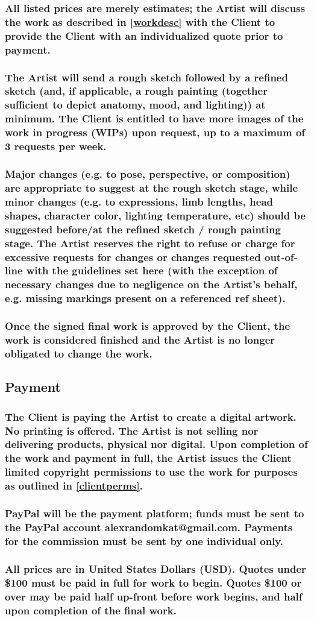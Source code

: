 \documentclass{article}
\newcommand{\subs}[2][]{\subsubsection[#1]{\normalfont #2}}
\begin{document}
\begin{flushleft}
		\subs[Estimations and Quotes]{All listed prices are merely estimates; the Artist will discuss the work as described in \ref{workdesc} with the Client to provide the Client with an individualized quote prior to payment.}

		\subs[WIPs]{The Artist will send a rough sketch followed by a refined sketch (and, if applicable, a rough painting (together sufficient to depict anatomy, mood, and lighting)) at minimum. The Client is entitled to have more images of the work in progress (WIPs) upon request, up to a maximum of 3 requests per week.}

		\subs[Changes and Feedback]{Major changes (e.g. to pose, perspective, or composition) are appropriate to suggest at the rough sketch stage, while minor changes (e.g. to expressions, limb lengths, head shapes, character color, lighting temperature, etc) should be suggested before/at the refined sketch / rough painting stage. The Artist reserves the right to refuse or charge for excessive requests for changes or changes requested out-of-line with the guidelines set here (with the exception of necessary changes due to negligence on the Artist's behalf, e.g. missing markings present on a referenced ref sheet).}

		\subs[Concluding Work]{Once the signed final work is approved by the Client, the work is considered finished and the Artist is no longer obligated to change the work.}

	\leftskip=1cm
	\subsection{Payment} 
	\leftskip=2cm
		\subs[Payment for a Service]{The Client is paying the Artist to create a digital artwork. No printing is offered. The Artist is not selling nor delivering products, physical nor digital. Upon completion of the work and payment in full, the Artist issues the Client limited copyright permissions to use the work for purposes as outlined in \ref{clientperms}.}

		\subs[Acceptable Payment Methods]{PayPal will be the payment platform; funds must be sent to the PayPal account alexrandomkat@gmail.com. Payments for the commission must be sent by one individual only.}

		\subs[Payment Plans]{All prices are in United States Dollars (USD). Quotes under \$100 must be paid in full for work to begin. Quotes \$100 or over may be paid half up-front before work begins, and half upon completion of the final work.}


\end{flushleft}
\end{document}
